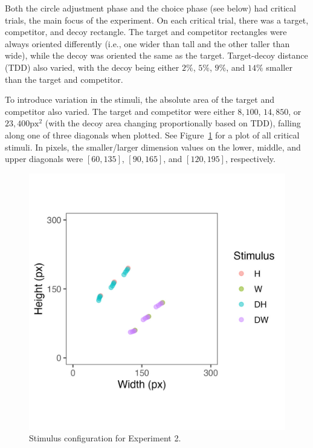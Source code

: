 Both the circle adjustment phase and the choice phase (see below) had critical trials, the main focus of the experiment. On each critical trial, there was a target, competitor, and decoy rectangle. The target and competitor rectangles were always oriented differently (i.e., one wider than tall and the other taller than wide), while the decoy was oriented the same as the target. Target-decoy distance (TDD) also varied, with the decoy being either $2\%$, $5\%$, $9\%$, and $14\%$ smaller than the target and competitor. 

To introduce variation in the stimuli, the absolute area of the target and competitor also varied. The target and competitor were either $8,100$, $14,850$, or $23,400 \text{px}^2$ (with the decoy area changing proportionally based on TDD), falling along one of three diagonals when plotted. See Figure~\ref{fig:e2_stim} for a plot of all critical stimuli. In pixels, the smaller/larger dimension values on the lower, middle, and upper diagonals were $[60, 135]$, $[90, 165]$, and $[120,195]$, respectively.
 
\begin{figure}
   \includegraphics[width=\linewidth]{figures/circle_exp_stim_plot.jpeg}
   \caption{Stimulus configuration for Experiment 2.}
   \label{fig:e2_stim}
\end{figure}

